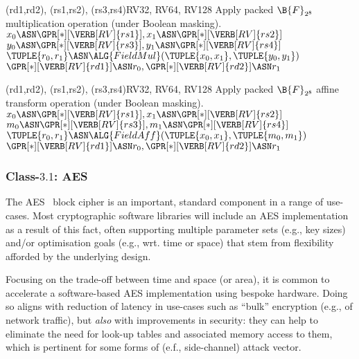 
   {(rd1,rd2), (rs1,rs2), (rs3,rs4)}{RV32, RV64, RV128}{
  Apply packed $\B{F}_{2^8}$ multiplication   operation 
  (under Boolean    masking).
}{
  $x_0 \ASN \GPR[*][{\VERB[RV]{rs1}}], x_1 \ASN \GPR[*][{\VERB[RV]{rs2}}]$ \;
  $y_0 \ASN \GPR[*][{\VERB[RV]{rs3}}], y_1 \ASN \GPR[*][{\VERB[RV]{rs4}}]$ \;
  $\TUPLE{ r_0, r_1 } \ASN \ALG{FieldMul}( \TUPLE{ x_0, x_1 }, \TUPLE{ y_0, y_1 } )$ \;
  $\GPR[*][{\VERB[RV]{rd1}}] \ASN r_0, \GPR[*][{\VERB[RV]{rd2}}] \ASN r_1$ \;
}


   {(rd1,rd2), (rs1,rs2), (rs3,rs4)}{RV32, RV64, RV128}{
  Apply packed $\B{F}_{2^8}$ affine transform operation 
  (under Boolean    masking).
}{
  $x_0 \ASN \GPR[*][{\VERB[RV]{rs1}}], x_1 \ASN \GPR[*][{\VERB[RV]{rs2}}]$ \;
  $m_0 \ASN \GPR[*][{\VERB[RV]{rs3}}], m_1 \ASN \GPR[*][{\VERB[RV]{rs4}}]$ \;
  $\TUPLE{ r_0, r_1 } \ASN \ALG{FieldAff}( \TUPLE{ x_0, x_1 }, \TUPLE{ m_0, m_1 } )$ \;
  $\GPR[*][{\VERB[RV]{rd1}}] \ASN r_0, \GPR[*][{\VERB[RV]{rd2}}] \ASN r_1$ \;
}


\subsubsection{Class-$3.1$: AES}
\label{sec:spec:instruction:3:1}

The 
AES~\cite{SCARV:FIPS:197} 
block cipher is an important, standard component in a range of use-cases.  
Most cryptographic software libraries will include an AES implementation 
as a result of this fact, often supporting multiple 
parameter sets     (e.g., key sizes)
and/or
optimisation goals (e.g., wrt. time or space)
that stem from flexibility afforded by the underlying design.

Focusing on the trade-off between time and space (or area), it is common
to accelerate a software-based AES implementation using bespoke hardware.
Doing so aligns with reduction of latency in use-cases such as ``bulk''
encryption (e.g., of network traffic), but {\em also} with improvements
in security: they can help to eliminate the need for look-up tables and 
associated memory access to them, which is pertinent for some forms of 
(e.f., side-channel) attack vector.

